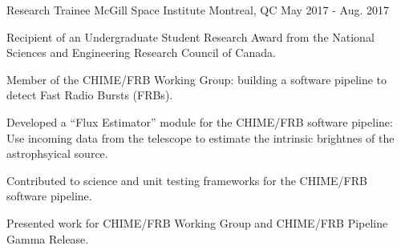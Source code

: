 \begin{cventries}
  \cventry
    {Research Trainee} %
    {McGill Space Institute} %
    {Montreal, QC} %
    {May 2017 - Aug. 2017} %
    {
      \begin{cvitems} %
        \item {Recipient of an Undergraduate Student Research Award from the National Sciences and Engineering Research Council of Canada.}
        \item {Member of the CHIME/FRB Working Group: building a software pipeline to detect Fast Radio Bursts (FRBs).}
        \item {Developed a ``Flux Estimator'' module for the CHIME/FRB software pipeline: Use incoming data from the telescope to estimate the intrinsic brightnes of the astrophsyical source.}
        \item {Contributed to science and unit testing frameworks for the CHIME/FRB software pipeline.}
        \item {Presented work for CHIME/FRB Working Group and CHIME/FRB Pipeline Gamma Release.}
      \end{cvitems}
    }



\end{cventries}
